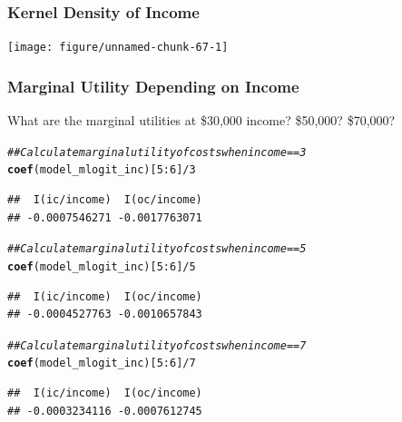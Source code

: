 \documentclass{beamer}\usepackage[]{graphicx}\usepackage[]{color}
\makeatletter
\newcommand{\hlnum}[1]{\textcolor[rgb]{0.686,0.059,0.569}{#1}}%
\newcommand{\hlcom}[1]{\textcolor[rgb]{0.678,0.584,0.686}{\textit{#1}}}%
\newcommand{\hlopt}[1]{\textcolor[rgb]{0,0,0}{#1}}%
\newcommand{\hlstd}[1]{\textcolor[rgb]{0.345,0.345,0.345}{#1}}%
\newcommand{\hlkwd}[1]{\textcolor[rgb]{0.737,0.353,0.396}{\textbf{#1}}}%
\newenvironment{kframe}{%
 \def\at@end@of@kframe{}%
 \ifinner\ifhmode%
  \def\at@end@of@kframe{\end{minipage}}%
  \begin{minipage}{\columnwidth}%
 \fi\fi%
 \def\FrameCommand##1{\hskip\@totalleftmargin \hskip-\fboxsep
 \colorbox{shadecolor}{##1}\hskip-\fboxsep
     \hskip-\linewidth \hskip-\@totalleftmargin \hskip\columnwidth}%
 \MakeFramed {\advance\hsize-\width
   \@totalleftmargin\z@ \linewidth\hsize
   \@setminipage}}%
 {\par\unskip\endMakeFramed%
 \at@end@of@kframe}
\newenvironment{knitrout}{}{} %
\makeatother
\begin{document}
\begin{frame}[fragile]\frametitle{Kernel Density of Income}
\begin{knitrout}\footnotesize
{}\color{fgcolor}

{\centering \texttt{[image: figure/unnamed-chunk-67-1]} 

}



\end{knitrout}
\end{frame}

\begin{frame}[fragile]\frametitle{Marginal Utility Depending on Income}
    What are the marginal utilities at \$30,000 income? \$50,000? \$70,000?
\begin{knitrout}\footnotesize
{}\color{fgcolor}\begin{kframe}
\begin{alltt}
\hlcom{## Calculate marginal utility of costs when income == 3}
\hlkwd{coef}\hlstd{(model_mlogit_inc)[}\hlnum{5}\hlopt{:}\hlnum{6}\hlstd{]} \hlopt{/} \hlnum{3}
\end{alltt}
\begin{verbatim}
##  I(ic/income)  I(oc/income) 
## -0.0007546271 -0.0017763071
\end{verbatim}
\begin{alltt}
\hlcom{## Calculate marginal utility of costs when income == 5}
\hlkwd{coef}\hlstd{(model_mlogit_inc)[}\hlnum{5}\hlopt{:}\hlnum{6}\hlstd{]} \hlopt{/} \hlnum{5}
\end{alltt}
\begin{verbatim}
##  I(ic/income)  I(oc/income) 
## -0.0004527763 -0.0010657843
\end{verbatim}
\begin{alltt}
\hlcom{## Calculate marginal utility of costs when income == 7}
\hlkwd{coef}\hlstd{(model_mlogit_inc)[}\hlnum{5}\hlopt{:}\hlnum{6}\hlstd{]} \hlopt{/} \hlnum{7}
\end{alltt}
\begin{verbatim}
##  I(ic/income)  I(oc/income) 
## -0.0003234116 -0.0007612745
\end{verbatim}
\end{kframe}
\end{knitrout}
\end{frame}
\end{document}
